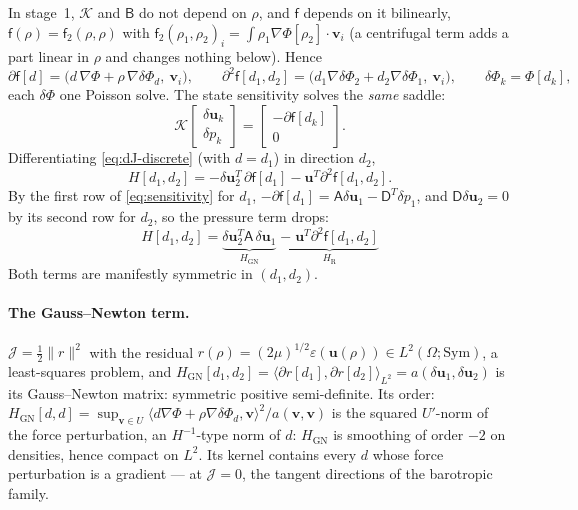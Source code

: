 \documentclass[11pt]{article}
\newcommand{\Jf}{\mathscr{J}}  %
\newcommand{\eps}{\varepsilon}
\newcommand{\bu}{\mathbf{u}}
\newcommand{\bv}{\mathbf{v}}
\newcommand{\norm}[1]{\lVert #1 \rVert}
\newcommand{\ip}[2]{\langle #1, #2\rangle}
\begin{document}
In stage~1, $\mathcal{K}$ and $\mathsf{B}$ do not depend on $\rho$, and
$\mathsf{f}$ depends on it bilinearly, $\mathsf{f}(\rho) =
\mathsf{f}_2(\rho,\rho)$ with $\mathsf{f}_2(\rho_1,\rho_2)_i =
\int\rho_1\nabla\Phi[\rho_2]\cdot\bv_i$ (a centrifugal term adds a
part linear in $\rho$ and changes nothing below). Hence
\begin{equation}
  \partial\mathsf{f}[d] = \bigl(d\,\nabla\Phi + \rho\,\nabla\delta\Phi_d,\ \bv_i\bigr),
  \qquad
  \partial^2\mathsf{f}[d_1,d_2] = \bigl(d_1\nabla\delta\Phi_{2} +
  d_2\nabla\delta\Phi_{1},\ \bv_i\bigr),
  \qquad \delta\Phi_k = \Phi[d_k],
\end{equation}
each $\delta\Phi$ one Poisson solve. The state sensitivity solves the
\emph{same} saddle:
\begin{equation}
  \mathcal{K}\begin{bmatrix}\delta\bu_k\\ \delta p_k\end{bmatrix}
  = \begin{bmatrix}-\partial\mathsf{f}[d_k]\\ 0\end{bmatrix} .
  \label{eq:sensitivity}
\end{equation}
Differentiating \eqref{eq:dJ-discrete} (with $d = d_1$) in direction
$d_2$,
\begin{equation}
  H[d_1,d_2] = -\delta\bu_2^{T}\,\partial\mathsf{f}[d_1]
               - \bu^{T}\partial^2\mathsf{f}[d_1,d_2] .
\end{equation}
By the first row of \eqref{eq:sensitivity} for $d_1$,
$-\partial\mathsf{f}[d_1] = \mathsf{A}\delta\bu_1 - \mathsf{D}^T\delta p_1$,
and $\mathsf{D}\delta\bu_2 = 0$ by its second row for $d_2$, so the
pressure term drops:
\begin{equation}
  \boxed{\;H[d_1,d_2] = \underbrace{\delta\bu_2^{T}\mathsf{A}\,\delta\bu_1}_{H_{\mathrm{GN}}}
  \;\underbrace{-\;\bu^{T}\partial^2\mathsf{f}[d_1,d_2]}_{H_{\mathrm{R}}}\;}
  \label{eq:hessian-split}
\end{equation}
Both terms are manifestly symmetric in $(d_1,d_2)$.

\paragraph{The Gauss--Newton term.} $\Jf  = \tfrac12\norm{r}^2$ with the
residual $r(\rho) = (2\mu)^{1/2}\eps(\bu(\rho)) \in L^2(\Omega;\mathrm{Sym})$,
a least-squares problem, and $H_{\mathrm{GN}}[d_1,d_2] =
\ip{\partial r[d_1]}{\partial r[d_2]}_{L^2} = a(\delta\bu_1,\delta\bu_2)$
is its Gauss--Newton matrix: symmetric positive semi-definite. Its order:
$H_{\mathrm{GN}}[d,d] = \sup_{\bv\in U}\ip{d\nabla\Phi +
\rho\nabla\delta\Phi_d}{\bv}^2/a(\bv,\bv)$ is the squared $U'$-norm of the
force perturbation, an $H^{-1}$-type norm of $d$: $H_{\mathrm{GN}}$ is
smoothing of order $-2$ on densities, hence compact on $L^2$. Its kernel
contains every $d$ whose force perturbation is a gradient --- at $\Jf  = 0$,
the tangent directions of the barotropic family.
\end{document}
